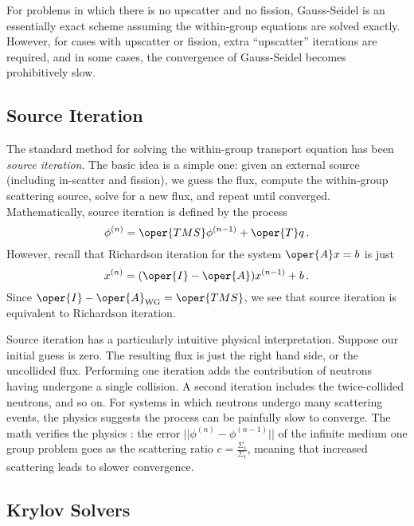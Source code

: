 For problems in which there is no upscatter and no fission, Gauss-Seidel
is an essentially exact scheme assuming the within-group equations are
solved exactly.  However, for cases with upscatter or fission, 
extra ``upscatter'' iterations are required, and in some cases, 
the convergence of Gauss-Seidel becomes prohibitively slow.

\subsection{Source Iteration}
The standard method for solving the within-group transport equation
has been \emph{source iteration}. The basic idea is a simple one:
given an external source (including in-scatter and fission), we guess the 
flux, compute the within-group scattering source, solve for a new flux, and 
repeat until converged.  Mathematically, source iteration is 
defined by the process 
\begin{equation}
 \phi^{(n)} = \oper{TMS}\phi^{(n-1)} + \oper{T}q \, .
\end{equation}
However, recall that Richardson iteration for the system $\oper{A}x=b$ 
is just 
\begin{equation}
 x^{(n)} = (\oper{I}-\oper{A})x^{(n-1)} + b \, .
\end{equation}
Since $\oper{I} - \oper{A}_{\text{WG}} = \oper{TMS}$, we see that 
source iteration is equivalent to Richardson iteration.

Source iteration has a particularly intuitive physical interpretation.
Suppose our initial guess is zero.  The resulting flux is just the 
right hand side, or the uncollided flux.  Performing one iteration 
adds the contribution of neutrons having undergone a single collision.
A second iteration includes the twice-collided neutrons, and so on. 
For systems in which neutrons undergo many scattering events, the physics 
suggests the process can be painfully slow to converge.  The math verifies
the physics \cite{larsen2010ado}: the error $||\phi^{(n)}-\phi^{(n-1)}||$ of 
the infinite medium one group problem goes as the scattering 
ratio $c = \frac{\Sigma_s}{\Sigma_t}$, meaning that increased scattering
leads to slower convergence.

\subsection{Krylov Solvers}
\label{sec:krylovsolvers}

